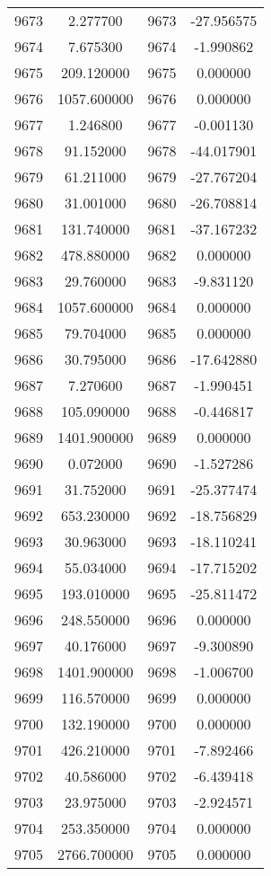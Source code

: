 \documentclass[12pt]{article}
\begin{document}
\begin{longtable}{@{}cccc@{}}
9673 & 2.277700 & 9673 & -27.956575 \\
9674 & 7.675300 & 9674 & -1.990862 \\
9675 & 209.120000 & 9675 & 0.000000 \\
9676 & 1057.600000 & 9676 & 0.000000 \\
9677 & 1.246800 & 9677 & -0.001130 \\
9678 & 91.152000 & 9678 & -44.017901 \\
9679 & 61.211000 & 9679 & -27.767204 \\
9680 & 31.001000 & 9680 & -26.708814 \\
9681 & 131.740000 & 9681 & -37.167232 \\
9682 & 478.880000 & 9682 & 0.000000 \\
9683 & 29.760000 & 9683 & -9.831120 \\
9684 & 1057.600000 & 9684 & 0.000000 \\
9685 & 79.704000 & 9685 & 0.000000 \\
9686 & 30.795000 & 9686 & -17.642880 \\
9687 & 7.270600 & 9687 & -1.990451 \\
9688 & 105.090000 & 9688 & -0.446817 \\
9689 & 1401.900000 & 9689 & 0.000000 \\
9690 & 0.072000 & 9690 & -1.527286 \\
9691 & 31.752000 & 9691 & -25.377474 \\
9692 & 653.230000 & 9692 & -18.756829 \\
9693 & 30.963000 & 9693 & -18.110241 \\
9694 & 55.034000 & 9694 & -17.715202 \\
9695 & 193.010000 & 9695 & -25.811472 \\
9696 & 248.550000 & 9696 & 0.000000 \\
9697 & 40.176000 & 9697 & -9.300890 \\
9698 & 1401.900000 & 9698 & -1.006700 \\
9699 & 116.570000 & 9699 & 0.000000 \\
9700 & 132.190000 & 9700 & 0.000000 \\
9701 & 426.210000 & 9701 & -7.892466 \\
9702 & 40.586000 & 9702 & -6.439418 \\
9703 & 23.975000 & 9703 & -2.924571 \\
9704 & 253.350000 & 9704 & 0.000000 \\
9705 & 2766.700000 & 9705 & 0.000000 \\

\end{longtable}
\end{document}
